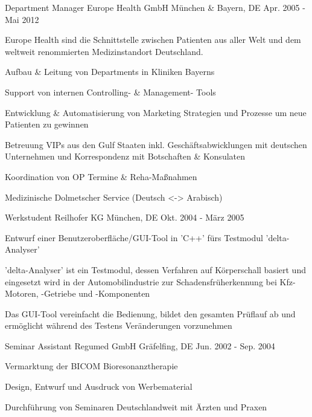 \begin{cventries}
\cventry
{Department Manager} %
{Europe Health GmbH} %
{M\"unchen \& Bayern, DE} %
{Apr. 2005 - Mai 2012} %
{ %
\begin{cvitems}
\item {Europe Health sind die Schnittstelle zwischen Patienten aus aller Welt und dem weltweit renommierten Medizinstandort Deutschland.}
\item {Aufbau \& Leitung von Departments in Kliniken Bayerns}
\item {Support von internen Controlling- \& Management- Tools}
\item {Entwicklung \& Automatisierung von Marketing Strategien und Prozesse um neue Patienten
zu gewinnen}
\item {Betreuung VIPs aus den Gulf Staaten inkl. Gesch\"aftsabwicklungen mit deutschen Unternehmen und Korrespondenz mit Botschaften \& Konsulaten}
\item {Koordination von OP Termine \& Reha-Ma\ss{}nahmen}
\item {Medizinische Dolmetscher Service (Deutsch <-> Arabisch)}
\end{cvitems} 
}


\cventry
{Werkstudent} %
{Reilhofer KG} %
{M\"unchen, DE} %
{Okt. 2004 - M\"arz 2005} %
{ %
\begin{cvitems}
\item {Entwurf einer Benutzeroberfl\"ache/GUI-Tool in 'C++' f\"urs Testmodul 'delta-Analyser'}
\item {'delta-Analyser' ist ein Testmodul, dessen Verfahren auf K\"orperschall basiert und eingesetzt wird in der Automobilindustrie zur Schadensfr\"uherkennung bei Kfz-Motoren, -Getriebe und -Komponenten}
\item {Das GUI-Tool vereinfacht die Bedienung, bildet den gesamten Pr\"uflauf ab und erm\"oglicht
w\"ahrend des Testens Ver\"anderungen vorzunehmen}
\end{cvitems}
}


\cventry
{Seminar Assistant} %
{Regumed GmbH} %
{Gr\"afelfing, DE} %
{Jun. 2002 - Sep. 2004} %
{ %
\begin{cvitems}
\item {Vermarktung der BICOM Bioresonanztherapie}
\item {Design, Entwurf und Ausdruck von Werbematerial}
\item {Durchf\"uhrung von Seminaren Deutschlandweit mit \"Arzten und Praxen}
\end{cvitems}
}


\end{cventries}